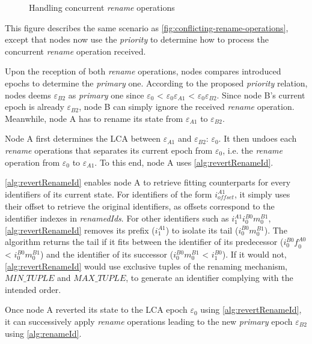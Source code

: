 \documentclass[10pt,journal,compsoc]{IEEEtran}
\let\MYoriglatexcaption\caption
\renewcommand{\caption}[2][\relax]{\MYoriglatexcaption[#2]{#2}}
\newcommand{\ie}{i.e. }
\newcommand{\trm}[1]{\mathit{#1}}
\newcommand{\id}[3]{$\trm{#1}^{\trm{#2}}_{\trm{#3}}$}
\newcommand{\epoch}[1]{$\varepsilon_{#1}$}
\begin{document}
\begin{figure}[t!]
    \caption{Handling concurrent \emph{rename} operations}
    \label{fig:revertRenameId}
\end{figure}

This figure describes the same scenario as \autoref{fig:conflicting-rename-operations}, except that nodes now use the \emph{priority} to determine how to process the concurrent \emph{rename} operation received.

Upon the reception of both \emph{rename} operations, nodes compares introduced epochs to determine the \emph{primary} one.
According to the proposed \emph{priority} relation, nodes deems \epoch{B2} as \emph{primary} one since \epoch{0} < \epoch{0}\epoch{A1} < \epoch{0}\epoch{B2}.
Since node B's current epoch is already \epoch{B2}, node B can simply ignore the received \emph{rename} operation.
Meanwhile, node A has to rename its state from \epoch{A1} to \epoch{B2}.

Node A first determines the \ac{LCA} between \epoch{A1} and \epoch{B2}: \epoch{0}.
It then undoes each \emph{rename} operations that separates its current epoch from \epoch{0}, \ie the \emph{rename} operation from \epoch{0} to \epoch{A1}.
To this end, node A uses \autoref{alg:revertRenameId}.

\autoref{alg:revertRenameId} enables node A to retrieve fitting counterparts for every identifiers of its current state.
For identifiers of the form \id{i}{A1}{offset}, it simply uses their offset to retrieve the original identifiers, as offsets correspond to the identifier indexes in \emph{renamedIds}.
For other identifiers such as \id{i}{A1}{1}\id{i}{B0}{0}\id{m}{B1}{0}, \autoref{alg:revertRenameId} removes its prefix (\id{i}{A1}{1}) to isolate its tail (\id{i}{B0}{0}\id{m}{B1}{0}).
The algorithm returns the tail if it fits between the identifier of its predecessor (\id{i}{B0}{0}\id{f}{A0}{0} < \id{i}{B0}{0}\id{m}{B1}{0}) and the identifier of its successor (\id{i}{B0}{0}\id{m}{B1}{0} < \id{i}{B0}{1}).
If it would not, \autoref{alg:revertRenameId} would use exclusive tuples of the renaming mechanism, $\trm{MIN\_TUPLE}$ and $\trm{MAX\_TUPLE}$, to generate an identifier complying with the intended order.

Once node A reverted its state to the LCA epoch \epoch{0} using \autoref{alg:revertRenameId}, it can successively apply \emph{rename} operations leading to the new \emph{primary} epoch \epoch{B2} using \autoref{alg:renameId}.
\end{document}
